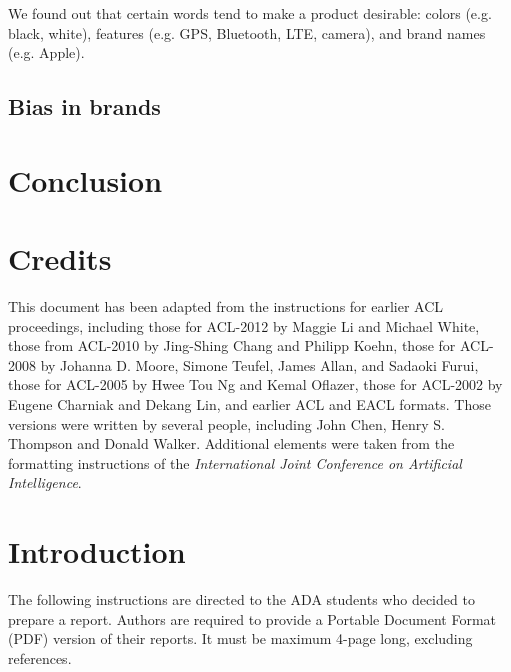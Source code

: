 \documentclass[11pt]{article}
\begin{document}
We found out that certain words tend to make a product desirable: colors (e.g. black, white), features (e.g. GPS, Bluetooth, LTE, camera), and brand names (e.g. Apple).


\subsection{Bias in brands}

\section{Conclusion}
\label{sec:conclusion}



\clearpage
\newpage



\section{Credits}

This document has been adapted from the instructions for earlier ACL
proceedings, including those for ACL-2012 by Maggie Li and Michael
White, those from ACL-2010 by Jing-Shing Chang and Philipp Koehn,
those for ACL-2008 by Johanna D. Moore, Simone Teufel, James Allan,
and Sadaoki Furui, those for ACL-2005 by Hwee Tou Ng and Kemal
Oflazer, those for ACL-2002 by Eugene Charniak and Dekang Lin, and
earlier ACL and EACL formats. Those versions were written by several
people, including John Chen, Henry S. Thompson and Donald
Walker. Additional elements were taken from the formatting
instructions of the {\em International Joint Conference on Artificial
  Intelligence}.

\section{Introduction}

The following instructions are directed to the ADA students who decided to prepare a report. Authors are
required to provide a Portable Document Format (PDF) version of their
reports. It must be maximum 4-page long, excluding references.
\end{document}
